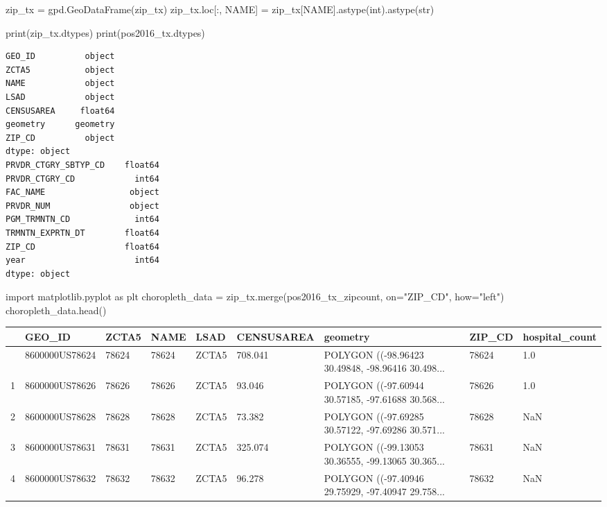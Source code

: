 \documentclass[
  letterpaper,
  DIV=11,
  numbers=noendperiod]{scrartcl}
\newenvironment{Shaded}{\begin{snugshade}}{\end{snugshade}}
\newcommand{\BuiltInTok}[1]{\textcolor[rgb]{0.00,0.23,0.31}{#1}}
\newcommand{\ImportTok}[1]{\textcolor[rgb]{0.00,0.46,0.62}{#1}}
\newcommand{\NormalTok}[1]{\textcolor[rgb]{0.00,0.23,0.31}{#1}}
\newcommand{\OperatorTok}[1]{\textcolor[rgb]{0.37,0.37,0.37}{#1}}
\newcommand{\StringTok}[1]{\textcolor[rgb]{0.13,0.47,0.30}{#1}}
\begin{document}
\begin{Shaded}
\begin{Highlighting}[]
\NormalTok{zip\_tx }\OperatorTok{=}\NormalTok{ gpd.GeoDataFrame(zip\_tx)}
\NormalTok{zip\_tx.loc[:, }\StringTok{\textquotesingle{}NAME\textquotesingle{}}\NormalTok{] }\OperatorTok{=}\NormalTok{ zip\_tx[}\StringTok{\textquotesingle{}NAME\textquotesingle{}}\NormalTok{].astype(}\BuiltInTok{int}\NormalTok{).astype(}\BuiltInTok{str}\NormalTok{)}
\end{Highlighting}
\end{Shaded}

\begin{Shaded}
\begin{Highlighting}[]
\BuiltInTok{print}\NormalTok{(zip\_tx.dtypes)  }
\BuiltInTok{print}\NormalTok{(pos2016\_tx.dtypes)}
\end{Highlighting}
\end{Shaded}

\begin{verbatim}
GEO_ID          object
ZCTA5           object
NAME            object
LSAD            object
CENSUSAREA     float64
geometry      geometry
ZIP_CD          object
dtype: object
PRVDR_CTGRY_SBTYP_CD    float64
PRVDR_CTGRY_CD            int64
FAC_NAME                 object
PRVDR_NUM                object
PGM_TRMNTN_CD             int64
TRMNTN_EXPRTN_DT        float64
ZIP_CD                  float64
year                      int64
dtype: object
\end{verbatim}

\begin{Shaded}
\begin{Highlighting}[]
\ImportTok{import}\NormalTok{ matplotlib.pyplot }\ImportTok{as}\NormalTok{ plt}
\NormalTok{choropleth\_data }\OperatorTok{=}\NormalTok{ zip\_tx.merge(pos2016\_tx\_zipcount, on}\OperatorTok{=}\StringTok{"ZIP\_CD"}\NormalTok{, how}\OperatorTok{=}\StringTok{"left"}\NormalTok{)}
\NormalTok{choropleth\_data.head()}
\end{Highlighting}
\end{Shaded}

\begin{longtable}[]{@{}lllllllll@{}}
\toprule\noalign{}
& GEO\_ID & ZCTA5 & NAME & LSAD & CENSUSAREA & geometry & ZIP\_CD &
hospital\_count \\
\midrule\noalign{}
\endhead
\bottomrule\noalign{}
\endlastfoot
0 & 8600000US78624 & 78624 & 78624 & ZCTA5 & 708.041 & POLYGON
((-98.96423 30.49848, -98.96416 30.498... & 78624 & 1.0 \\
1 & 8600000US78626 & 78626 & 78626 & ZCTA5 & 93.046 & POLYGON
((-97.60944 30.57185, -97.61688 30.568... & 78626 & 1.0 \\
2 & 8600000US78628 & 78628 & 78628 & ZCTA5 & 73.382 & POLYGON
((-97.69285 30.57122, -97.69286 30.571... & 78628 & NaN \\
3 & 8600000US78631 & 78631 & 78631 & ZCTA5 & 325.074 & POLYGON
((-99.13053 30.36555, -99.13065 30.365... & 78631 & NaN \\
4 & 8600000US78632 & 78632 & 78632 & ZCTA5 & 96.278 & POLYGON
((-97.40946 29.75929, -97.40947 29.758... & 78632 & NaN \\
\end{longtable}
\end{document}

